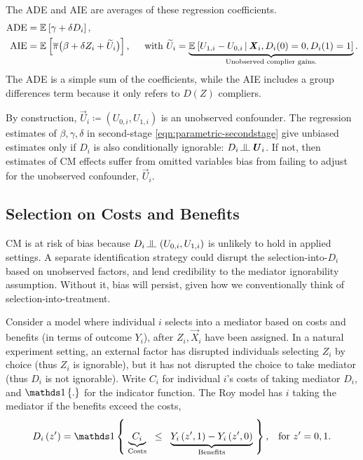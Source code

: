 The ADE and AIE are averages of these regression coefficients.
\begin{align*}
    \text{ADE}
        &= \mathbb{E}_{} \left[ \gamma + \delta D_i \right], \\
    \text{AIE}
        &= \mathbb{E}_{} \left[  \overline{\pi} \big( \beta +  \delta Z_i + \widetilde{U}_i \big) \right],
        \;\;\;\; \text{ with } \widetilde{U}_i
            = \underbrace{\mathbb{E}_{} \left[  U_{1,i} - U_{0,i} \, \middle\vert \, 
                \boldsymbol{\mathit{X}}_i, D_i(0) = 0, D_i(1) = 1 \right]}_{
                    \text{Unobserved complier gains.}}.
\end{align*}
The ADE is a simple sum of the coefficients, while the AIE includes a group differences term because it only refers to $D(Z)$ compliers.

By construction, $\vec U_i \coloneqq \left(U_{0, i}, U_{1, i} \right)$ is an unobserved confounder.
The regression estimates of $\beta, \gamma, \delta$ in second-stage \eqref{eqn:parametric-secondstage} give unbiased estimates only if $D_i$ is also conditionally ignorable: $D_i \indep  \vec U_{i} $.
If not, then estimates of CM effects suffer from omitted variables bias from failing to adjust for the unobserved confounder, $\vec U_i$.

\subsection{Selection on Costs and Benefits}
CM is at risk of bias because $D_i \indep  \left(U_{0, i}, U_{1, i} \right)$ is unlikely to hold in applied settings.
A separate identification strategy could disrupt the selection-into-$D_i$ based on unobserved factors, and lend credibility to the mediator ignorability assumption.
Without it, bias will persist, given how we conventionally think of selection-into-treatment.

Consider a model where individual $i$ selects into a mediator based on costs and benefits (in terms of outcome $Y_i$), after $Z_i, \vec X_i$ have been assigned.
In a natural experiment setting, an external factor has disrupted individuals selecting $Z_i$ by choice (thus $Z_i$ is ignorable), but it has not disrupted the choice to take mediator (thus $D_i$ is not ignorable).
Write $C_i$ for individual $i$'s costs of taking mediator $D_i$, and $\indicator{.}$ for the indicator function.
The Roy model has $i$ taking the mediator if the benefits exceed the costs,
\begin{equation}
    \label{eqn:roy-model}
    D_i \left( z' \right) = \indicator{ \;
    \underbrace{C_i}_{\text{Costs}} \;\; \leq \;\;
        \underbrace{
            Y_i\left( z', 1 \right) - Y_i\left( z', 0 \right)}_{\text{Benefits}}
    \;}, \;\;\; \text{for } z'=0,1.
\end{equation}

